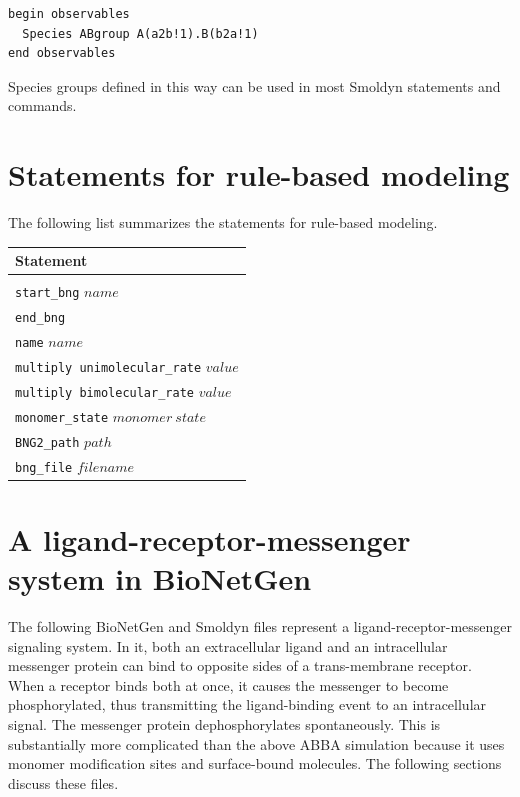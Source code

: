 \documentclass {book}
\newcommand {\ttt} {\texttt}
\begin{document}
\begin{lstlisting}[style=SSAC]
begin observables
  Species ABgroup A(a2b!1).B(b2a!1)
end observables
\end{lstlisting}

Species groups defined in this way can be used in most Smoldyn statements and commands.

\section{Statements for rule-based modeling}

The following list summarizes the statements for rule-based modeling.

\begin{longtable}[c]{l}
Statement\\
\hline\\
\ttt{start\_bng} $name$\\
\ttt{end\_bng}\\
\ttt{name} $name$\\
\ttt{multiply unimolecular\_rate} $value$\\
\ttt{multiply bimolecular\_rate} $value$\\
\ttt{monomer\_state} $monomer\ state$\\
\ttt{BNG2\_path} $path$\\
\ttt{bng\_file} $filename$
\end{longtable}

\section{A ligand-receptor-messenger system in BioNetGen}

The following BioNetGen and Smoldyn files represent a ligand-receptor-messenger signaling system. In it, both an extracellular ligand and an intracellular messenger protein can bind to opposite sides of a trans-membrane receptor. When a receptor binds both at once, it causes the messenger to become phosphorylated, thus transmitting the ligand-binding event to an intracellular signal. The messenger protein dephosphorylates spontaneously. This is substantially more complicated than the above ABBA simulation because it uses monomer modification sites and surface-bound molecules. The following sections discuss these files.
\end{document}

